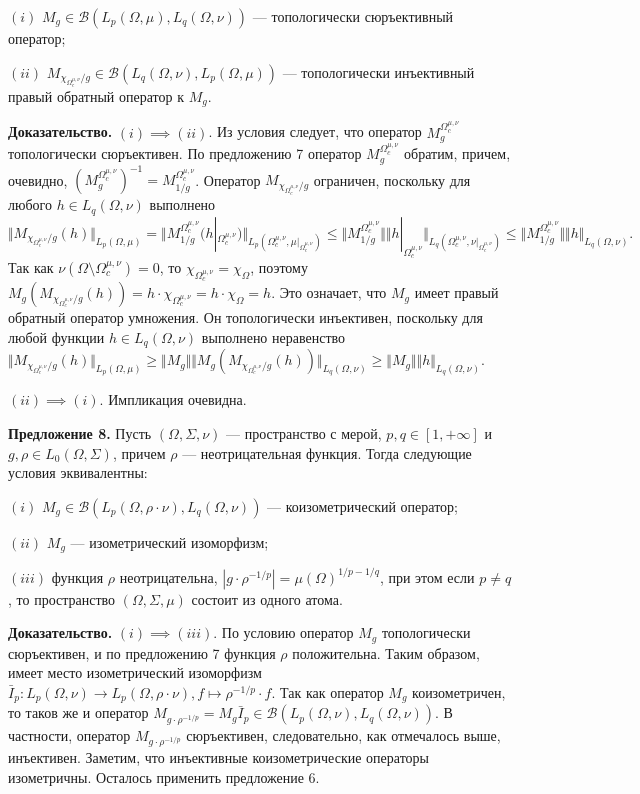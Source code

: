 \documentclass[11pt,twoside]{article}
\begin{document}
$(i)$ $M_g\in\mathcal{B}(L_p(\Omega,\mu),L_q(\Omega,\nu))$ --- топологически сюръективный оператор;

$(ii)$ $M_{\chi_{\Omega_c^{\mu,\nu}}/g}\in\mathcal{B}(L_q(\Omega,\nu), L_p(\Omega,\mu))$ --- топологически инъективный правый обратный оператор к $M_g$.

\textbf{Доказательство.} $(i)$$\implies$$ (ii)$. Из условия следует, что оператор $M_g^{\Omega_c^{\mu,\nu}}$ топологически сюръективен. По предложению 7 оператор $M_g^{\Omega_c^{\mu,\nu}}$ обратим, причем, очевидно, $(M_g^{\Omega_c^{\mu,\nu}})^{-1}=M_{1/g}^{\Omega_c^{\mu,\nu}}$. Оператор $M_{\chi_{\Omega_c^{\mu,\nu}}/g}$ ограничен, поскольку для любого $h\in L_q(\Omega,\nu)$ выполнено 
$$
\Vert M_{\chi_{\Omega_c^{\mu,\nu}}/g}(h)\Vert_{L_p(\Omega,\mu)}=
\Vert M_{1/g}^{\Omega_c^{\mu,\nu}}(h|_{\Omega_c^{\mu,\nu}})\Vert_{L_p(\Omega_c^{\mu,\nu},\mu|_{\Omega_c^{\mu,\nu}})}
\leq\Vert M_{1/g}^{\Omega_c^{\mu,\nu}}\Vert\Vert h|_{\Omega_c^{\mu,\nu}}\Vert_{L_q(\Omega_c^{\mu,\nu},\nu|_{\Omega_c^{\mu,\nu}})}
\leq\Vert M_{1/g}^{\Omega_c^{\mu,\nu}}\Vert\Vert h\Vert_{L_q(\Omega,\nu)}.
$$ 
Так как $\nu(\Omega\setminus\Omega_c^{\mu,\nu})=0$, то $\chi_{\Omega_c^{\mu,\nu}}=\chi_{\Omega}$, поэтому $M_g(M_{\chi_{\Omega_c^{\mu,\nu}}/g}(h))=h\cdot\chi_{\Omega_c^{\mu,\nu}}=h\cdot\chi_{\Omega}=h$. Это означает, что $M_g$ имеет правый обратный оператор умножения. Он топологически инъективен, поскольку для любой функции $h\in L_q(\Omega,\nu)$ выполнено неравенство $\Vert M_{\chi_{\Omega_c^{\mu,\nu}}/g}(h)\Vert_{L_p(\Omega,\mu)}
\geq\Vert M_g\Vert\Vert M_g(M_{\chi_{\Omega_c^{\mu,\nu}}/g}(h))\Vert_{L_q(\Omega,\nu)}
\geq\Vert M_g\Vert\Vert h\Vert_{L_q(\Omega,\nu)}$.

$(ii)$$\implies$$ (i)$. Импликация очевидна.

\textbf{Предложение 8.} Пусть $(\Omega,\Sigma,\nu)$ --- пространство с мерой, $p,q\in[1,+\infty]$ и $g,\rho\in L_0(\Omega,\Sigma)$, причем $\rho$ --- неотрицательная функция. Тогда следующие условия эквивалентны:

$(i)$ $M_g\in\mathcal{B}(L_p(\Omega,\rho\cdot\nu),L_q(\Omega,\nu))$ --- коизометрический оператор;

$(ii)$ $M_g$ --- изометрический изоморфизм;

$(iii)$ функция $\rho$ неотрицательна, $|g\cdot \rho^{-1/p}|=\mu(\Omega)^{1/p-1/q}$, при этом если $p\neq q$, то пространство $(\Omega,\Sigma,\mu)$ состоит из одного атома.

\textbf{Доказательство.} $(i)$$\implies$$ (iii)$. По условию оператор $M_g$ топологически сюръективен, и по предложению 7 функция $\rho$ положительна. Таким образом, имеет место изометрический изоморфизм $\bar{I}_p:L_p(\Omega,\nu)\to L_p(\Omega,\rho\cdot\nu),f\mapsto \rho^{-1/p}\cdot f$. Так как оператор $M_g$ коизометричен, то таков же и оператор $M_{g\cdot \rho^{-1/p}}=M_g\bar{I}_p\in\mathcal{B}(L_p(\Omega,\nu),L_q(\Omega,\nu))$. В частности, оператор $M_{g\cdot \rho^{-1/p}}$ сюръективен, следовательно, как отмечалось выше, инъективен. Заметим, что инъективные коизометрические операторы изометричны. Осталось применить предложение 6.
\end{document}
